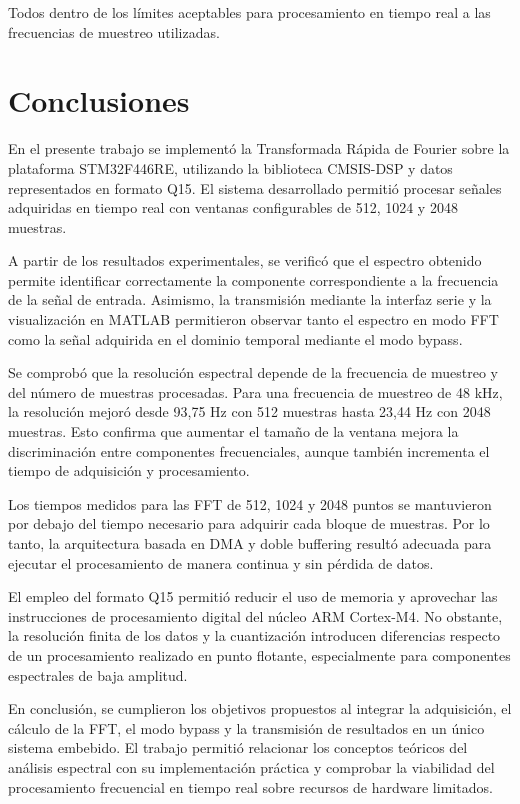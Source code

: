 \documentclass[12pt]{article}
\begin{document}
			Todos dentro de los límites aceptables para procesamiento en tiempo real a las frecuencias de muestreo utilizadas.


	\section{Conclusiones}

		En el presente trabajo se implementó la Transformada Rápida de Fourier sobre la plataforma STM32F446RE, utilizando la biblioteca CMSIS-DSP y datos representados en formato Q15. El sistema desarrollado permitió procesar señales adquiridas en tiempo real con ventanas configurables de 512, 1024 y 2048 muestras.

		A partir de los resultados experimentales, se verificó que el espectro obtenido permite identificar correctamente la componente correspondiente a la frecuencia de la señal de entrada. Asimismo, la transmisión mediante la interfaz serie y la visualización en MATLAB permitieron observar tanto el espectro en modo FFT como la señal adquirida en el dominio temporal mediante el modo bypass.

		Se comprobó que la resolución espectral depende de la frecuencia de muestreo y del número de muestras procesadas. Para una frecuencia de muestreo de 48 kHz, la resolución mejoró desde 93,75 Hz con 512 muestras hasta 23,44 Hz con 2048 muestras. Esto confirma que aumentar el tamaño de la ventana mejora la discriminación entre componentes frecuenciales, aunque también incrementa el tiempo de adquisición y procesamiento.

		Los tiempos medidos para las FFT de 512, 1024 y 2048 puntos se mantuvieron por debajo del tiempo necesario para adquirir cada bloque de muestras. Por lo tanto, la arquitectura basada en DMA y doble buffering resultó adecuada para ejecutar el procesamiento de manera continua y sin pérdida de datos.

		El empleo del formato Q15 permitió reducir el uso de memoria y aprovechar las instrucciones de procesamiento digital del núcleo ARM Cortex-M4. No obstante, la resolución finita de los datos y la cuantización introducen diferencias respecto de un procesamiento realizado en punto flotante, especialmente para componentes espectrales de baja amplitud.

		En conclusión, se cumplieron los objetivos propuestos al integrar la adquisición, el cálculo de la FFT, el modo bypass y la transmisión de resultados en un único sistema embebido. El trabajo permitió relacionar los conceptos teóricos del análisis espectral con su implementación práctica y comprobar la viabilidad del procesamiento frecuencial en tiempo real sobre recursos de hardware limitados.

	
\end{document}
